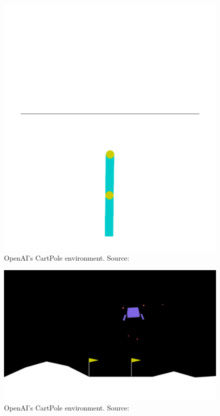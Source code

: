 \documentclass{article}
\begin{document}
\begin{figure}[htbp]
    \centering
    \includegraphics[width=0.9\linewidth]{figs/acrobot.png}
    \caption{
        OpenAI's CartPole environment. 
        Source: \cite{gymlibraryAcrobot}
    }
    \label{fig:cartpole}
\end{figure}

\begin{figure}[htbp]
    \centering
    \includegraphics[width=0.9\linewidth]{figs/lunarlander.png}
    \caption{
        OpenAI's CartPole environment. 
        Source: \cite{gymlibraryLunarLander}
    }
    \label{fig:cartpole}
\end{figure}
\end{document}
